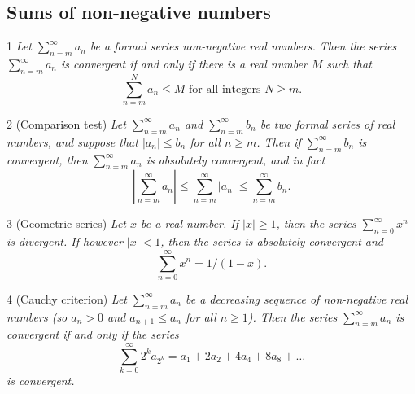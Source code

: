 \subsection{Sums of non-negative numbers}
\begin{proposition}{1}
    \label{nonneg-series-bounded}
    \emph{Let $\sum_{n=m}^{\infty} a_n$ be a formal series non-negative real numbers.
    Then the series $\sum_{n=m}^{\infty} a_n$ is convergent if and only if there
    is a real number $M$ such that
    \begin{equation*}
        \sum_{n=m}^{N} a_n \leq M \text{ for all integers $N \geq m$}.
    \end{equation*}
    }
\end{proposition}

\begin{corollary}{2}
    \label{comparison-test}
    (Comparison test) \emph{Let $\sum_{n=m}^{\infty} a_n$ and $\sum_{n=m}^{\infty} b_n$
    be two formal series of real numbers, and suppose that $|a_n| \leq b_n$
    for all $n \geq m$. Then if $\sum_{n=m}^{\infty} b_n$ is convergent, then
    $\sum_{n=m}^{\infty} a_n$ is absolutely convergent, and in fact
    \begin{equation*}
        |\sum_{n=m}^{\infty} a_n| \leq \sum_{n=m}^{\infty} |a_n| \leq \sum_{n=m}^{\infty} b_n.
    \end{equation*}
}
\end{corollary}

\begin{lemma}{3}
    \label{geometric-series}
    (Geometric series) \emph{Let $x$ be a real number. If $|x| \geq 1$, then the
    series $\sum_{n=0}^{\infty} x^n$ is divergent. If however $|x| < 1$, then
    the series is absolutely convergent and
    \begin{equation*}
        \sum_{n=0}^{\infty} x^n = 1/(1-x).
    \end{equation*}
}
\end{lemma}

\begin{proposition}{4}
    \label{cauchy-condensation}
    (Cauchy criterion) \emph{Let $\sum_{n=m}^{\infty} a_n$ be a decreasing sequence
    of non-negative real numbers (so $a_n > 0$ and $a_{n+1} \leq a_n$ for all $n \geq 1$).
    Then the series $\sum_{n=m}^{\infty} a_n$ is convergent if and only if the
    series
    \begin{equation*}
        \sum_{k=0}^{\infty} 2^k a_{2^k} = a_1 + 2a_2 + 4a_4 + 8a_8 + \ldots
    \end{equation*}
    is convergent.}
\end{proposition}

